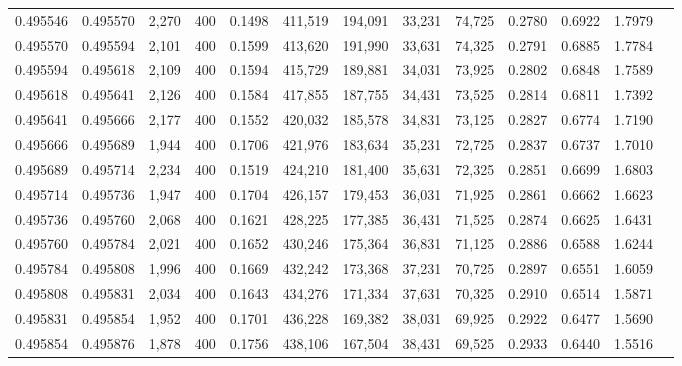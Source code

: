 \begin{tabular}{rrrrrrrrrrrrr}
0.495546 & 0.495570 &  2,270 & 400 &                                     0.1498 & 411,519 & 194,091 &  33,231 &  74,725 & 0.2780 & 0.6922 & 1.7979 \\
0.495570 & 0.495594 &  2,101 & 400 &                                     0.1599 & 413,620 & 191,990 &  33,631 &  74,325 & 0.2791 & 0.6885 & 1.7784 \\
0.495594 & 0.495618 &  2,109 & 400 &                                     0.1594 & 415,729 & 189,881 &  34,031 &  73,925 & 0.2802 & 0.6848 & 1.7589 \\
0.495618 & 0.495641 &  2,126 & 400 &                                     0.1584 & 417,855 & 187,755 &  34,431 &  73,525 & 0.2814 & 0.6811 & 1.7392 \\
0.495641 & 0.495666 &  2,177 & 400 &                                     0.1552 & 420,032 & 185,578 &  34,831 &  73,125 & 0.2827 & 0.6774 & 1.7190 \\
0.495666 & 0.495689 &  1,944 & 400 &                                     0.1706 & 421,976 & 183,634 &  35,231 &  72,725 & 0.2837 & 0.6737 & 1.7010 \\
0.495689 & 0.495714 &  2,234 & 400 &                                     0.1519 & 424,210 & 181,400 &  35,631 &  72,325 & 0.2851 & 0.6699 & 1.6803 \\
0.495714 & 0.495736 &  1,947 & 400 &                                     0.1704 & 426,157 & 179,453 &  36,031 &  71,925 & 0.2861 & 0.6662 & 1.6623 \\
0.495736 & 0.495760 &  2,068 & 400 &                                     0.1621 & 428,225 & 177,385 &  36,431 &  71,525 & 0.2874 & 0.6625 & 1.6431 \\
0.495760 & 0.495784 &  2,021 & 400 &                                     0.1652 & 430,246 & 175,364 &  36,831 &  71,125 & 0.2886 & 0.6588 & 1.6244 \\
0.495784 & 0.495808 &  1,996 & 400 &                                     0.1669 & 432,242 & 173,368 &  37,231 &  70,725 & 0.2897 & 0.6551 & 1.6059 \\
0.495808 & 0.495831 &  2,034 & 400 &                                     0.1643 & 434,276 & 171,334 &  37,631 &  70,325 & 0.2910 & 0.6514 & 1.5871 \\
0.495831 & 0.495854 &  1,952 & 400 &                                     0.1701 & 436,228 & 169,382 &  38,031 &  69,925 & 0.2922 & 0.6477 & 1.5690 \\
0.495854 & 0.495876 &  1,878 & 400 &                                     0.1756 & 438,106 & 167,504 &  38,431 &  69,525 & 0.2933 & 0.6440 & 1.5516 \\

\end{tabular}
